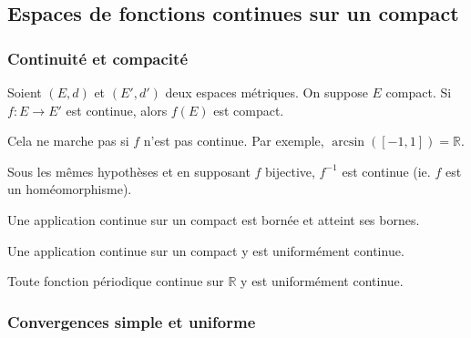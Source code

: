 




  \subsection{Espaces de fonctions continues sur un compact}

  \subsubsection{Continuité et compacité}


  \begin{proposition}
    Soient $(E, d)$ et $(E', d')$ deux espaces métriques. On suppose $E$ compact. Si $f : E \rightarrow E'$ est continue, alors $f(E)$ est compact.
  \end{proposition}

  \begin{cexample}
    Cela ne marche pas si $f$ n'est pas continue. Par exemple, $\arcsin([-1, 1]) = \mathbb{R}$.
  \end{cexample}

  \begin{proposition}
    Sous les mêmes hypothèses et en supposant $f$ bijective, $f^{-1}$ est continue (ie. $f$ est un homéomorphisme).
  \end{proposition}

  \begin{theorem}
    Une application continue sur un compact est bornée et atteint ses bornes.
  \end{theorem}

  \begin{theorem}[Heine]
    Une application continue sur un compact y est uniformément continue.
  \end{theorem}

  \begin{corollary}
    Toute fonction périodique continue sur $\mathbb{R}$ y est uniformément continue.
  \end{corollary}

  \subsubsection{Convergences simple et uniforme}


